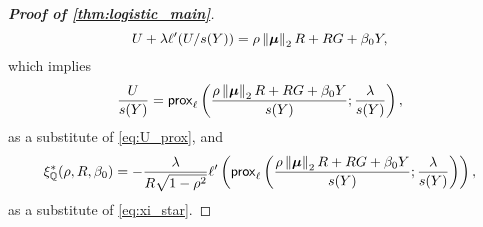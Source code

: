 \begin{proof}[\textbf{Proof of \cref{thm:logistic_main}}]
    \begin{equation*}
        U + \lambda \ell' ( U/s(Y) ) = \rho\left\|{{\boldsymbol{\mu}}}\right\|_2 R + RG + \beta_0 Y,
    \end{equation*}
    which implies
    \begin{equation}
    \label{eq:ERM_U_new}
        \frac{U}{s(Y)} = \mathsf{prox}_{\ell}\left( \frac{\rho\left\|{{\boldsymbol{\mu}}}\right\|_2 R + RG + \beta_0 Y}{s(Y)} ; \frac{\lambda}{s(Y)} \right),
    \end{equation}
    as a substitute of \cref{eq:U_prox},
    and
    \begin{equation*}
        \xi^*_{\mathbb{Q}}(\rho, R, \beta_0) = -\frac{\lambda}{R\sqrt{1 - \rho^2}} \ell'\left( \mathsf{prox}_{\ell}\left( \frac{\rho\left\|{{\boldsymbol{\mu}}}\right\|_2 R + RG + \beta_0 Y}{s(Y)} ; \frac{\lambda}{s(Y)} \right) \right),
    \end{equation*}
    as a substitute of \cref{eq:xi_star}.


\end{proof}
